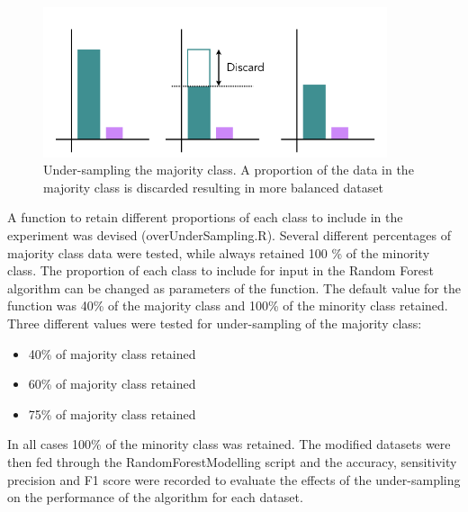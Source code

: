\begin{figure}[!htbp]
    \centering
    \includegraphics[width=0.9\textwidth]{ThesisTemplate/usingLatex/chapter4Images/Figure2001.png}
    \caption{Under-sampling the majority class. A proportion of the data in the majority class is discarded resulting in more balanced dataset}
    \label{fig:UnderSampling}
\end{figure}


A function to retain different proportions of each class to include in the experiment was devised (overUnderSampling.R). Several different percentages of majority class data were tested, while always retained 100 \% of the minority class.\newline
The proportion of each class to include for input in the Random Forest algorithm can be changed as parameters of the function.\newline
The default value for the function was 40\% of the majority class and 100\% of the minority class retained.\newline
Three different values were tested for under-sampling of the majority class:
\begin{itemize}
    \item 40\% of majority class retained
    \item 60\% of majority class retained
    \item 75\% of majority class retained
\end{itemize}

In all cases 100\% of the minority class was retained.\newline
The modified datasets were then fed through the RandomForestModelling script and the accuracy, sensitivity precision and F1 score were recorded to evaluate the effects of the under-sampling on the performance of the algorithm for each dataset.\newline


